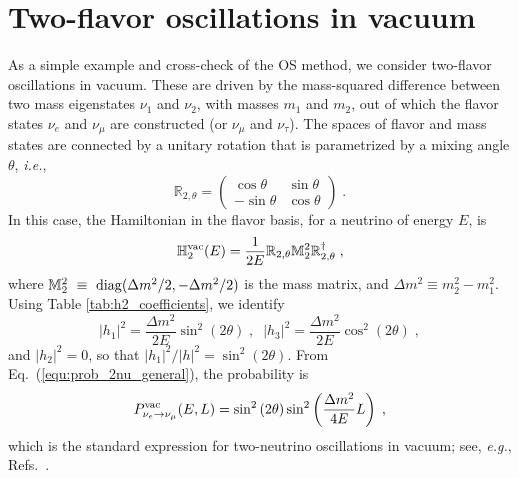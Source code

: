 \documentclass[final,5p,times,twocolumn]{elsarticle}
\newcommand{\ie}{{\it i.e.}}
\newcommand{\eg}{{\it e.g.}}
\newcommand{\eq}{Eq.}
\newcommand{\Ref}{Ref.}
\newcommand{\Refs}{Refs.}
\newcommand{\equ}[1]{\eq~(\ref{equ:#1})}
\begin{document}


\section{Two-flavor oscillations in vacuum}
\label{section:2nu_vacuum}

As a simple example and cross-check of the OS method, we consider two-flavor oscillations in vacuum.  These are driven by the mass-squared difference between two mass eigenstates $\nu_1$ and $\nu_2$, with masses $m_1$ and $m_2$, out of which the flavor states $\nu_e$ and $\nu_\mu$ are constructed (or $\nu_\mu$ and $\nu_\tau$).  The spaces of flavor and mass states are connected by a unitary rotation that is parametrized by a mixing angle $\theta$, \ie,
\begin{equation}
 \label{equ:u_rotation_2nu}
 \mathbb{R}_{2,\theta}
 =
 \left(\begin{array}{cc}
  \cos \theta  & \sin \theta \\
  -\sin \theta & \cos \theta 
 \end{array}\right) \;.
\end{equation}
In this case, the Hamiltonian in the flavor basis, for a neutrino of energy $E$, is
\begin{equation}
 \label{equ:h2_vacuum}
 \mathbb{H}_2^{\rm vac}(E)
 =
 \frac{1}{2E}
 \mathbb{R}_{2,\theta}
 \mathbb{M}_2^2
 \mathbb{R}_{2,\theta}^\dagger \;,
\end{equation}
where $\mathbb{M}_2^2~\equiv~{\rm diag}(\Delta m^2/2, -\Delta m^2/2)$ is the mass matrix, and $\Delta m^2\equiv m_2^2-m_1^2$.  Using Table \ref{tab:h2_coefficients}, we identify
\begin{equation*}
 \lvert h_1 \rvert^2 = \frac{\Delta m^2}{2E} \sin^2\left(2\theta\right) \;, \;\;
 \lvert h_3 \rvert^2 = \frac{\Delta m^2}{2E} \cos^2\left(2\theta\right) \;,
\end{equation*}
and $\lvert h_2 \rvert^2 = 0$, so that $\lvert h_1 \rvert^2 / \lvert h \rvert^2  = \sin^2\left(2\theta\right)$.  From \equ{prob_2nu_general}, the probability is
\begin{equation*}
 P_{\nu_e \to \nu_\mu}^{\rm vac} (E, L)
 =
 \sin^2 \left(2\theta\right)
 \sin^2\left(\frac{\Delta m^2}{4E}L\right) \;,
\end{equation*}
which is the standard expression for two-neutrino oscillations in vacuum; see, \eg, \Refs\ \cite{Giunti:2007ry, Tanabashi:2018oca}.  
\end{document}
